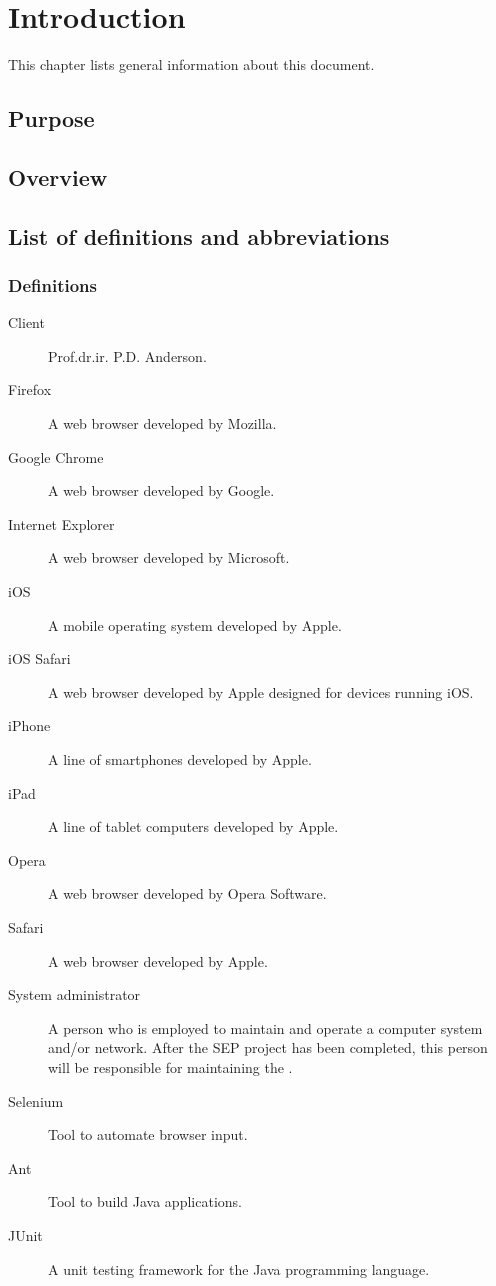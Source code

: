 \chapter{Introduction}
This chapter lists general information about this document.

\section{Purpose}

\section{Overview}

\section{List of definitions and abbreviations}

\subsection{Definitions}

\begin{description}
\item[Client] Prof.dr.ir. P.D. Anderson.
\item[Firefox] A web browser developed by Mozilla.
\item[Google Chrome] A web browser developed by Google.
\item[Internet Explorer] A web browser developed by Microsoft.
\item[iOS] A mobile operating system developed by Apple.
\item[iOS Safari] A web browser developed by Apple designed for devices running iOS.
\item[iPhone] A line of smartphones developed by Apple.
\item[iPad] A line of tablet computers developed by Apple.
\item[Opera] A web browser developed by Opera Software.
\item[Safari] A web browser developed by Apple.
\item[System administrator] A person who is employed to maintain and operate a computer system and/or network. After the SEP project has been completed, this person will be responsible for maintaining the \applicationname{}.
\item[Selenium] Tool to automate browser input.
\item[Ant] Tool to build Java applications.
\item[JUnit] A unit testing framework for the Java programming language.
\end{description}

